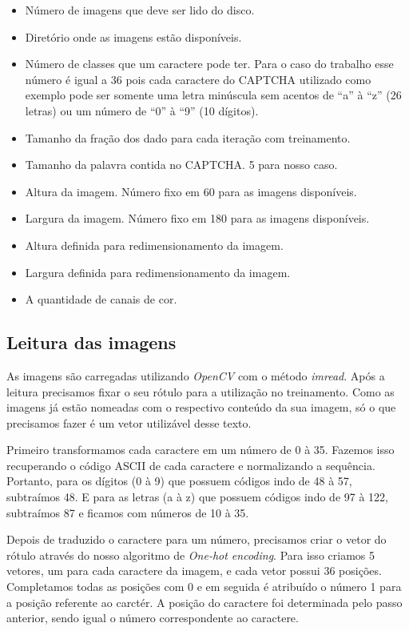 \begin{itemize}

  \item Número de imagens que deve ser lido do disco.
  \item Diretório onde as imagens estão disponíveis.
  \item Número de classes que um caractere pode ter. Para o caso do
    trabalho esse número é igual a 36 pois cada caractere do CAPTCHA
    utilizado como exemplo pode ser somente uma letra minúscula sem
    acentos de ``a'' à ``z'' (26 letras) ou um número de ``0'' à ``9''
    (10 dígitos).
  \item Tamanho da fração dos dado para cada iteração com treinamento.
  \item Tamanho da palavra contida no CAPTCHA. 5 para nosso caso.
  \item Altura da imagem. Número fixo em 60 para as imagens disponíveis.
  \item Largura da imagem. Número fixo em 180 para as imagens
    disponíveis.
  \item Altura definida para redimensionamento da imagem.
  \item Largura definida para redimensionamento da imagem.
  \item A quantidade de canais de cor.

\end{itemize}

\subsection{Leitura das imagens}

As imagens são carregadas utilizando \textit{OpenCV}\cite{OpenCV} com
o método \textit{imread}. Após a leitura precisamos fixar o seu rótulo
para a utilização no treinamento. Como as imagens já estão nomeadas
com o respectivo conteúdo da sua imagem, só o que precisamos fazer é
um vetor utilizável desse texto. 

Primeiro transformamos cada caractere em um número de 0 à 35. Fazemos
isso recuperando o código ASCII de cada caractere e normalizando a
sequência. Portanto, para os dígitos (0 à 9) que possuem códigos indo
de 48 à 57, subtraímos 48. E para as letras (a à z) que possuem
códigos indo de 97 à 122, subtraímos 87 e ficamos com números de 10 à
35. 

Depois de traduzido o caractere para um número, precisamos criar o
vetor do rótulo através do nosso algoritmo de \textit{One-hot
  encoding}. Para isso criamos 5 vetores, um para cada caractere da
imagem, e cada vetor possui 36 posições. Completamos todas as posições
com 0 e em seguida é atribuído o número 1 para a posição referente ao
carctér. A posição do caractere foi determinada pelo passo anterior,
sendo igual o número correspondente ao caractere.

